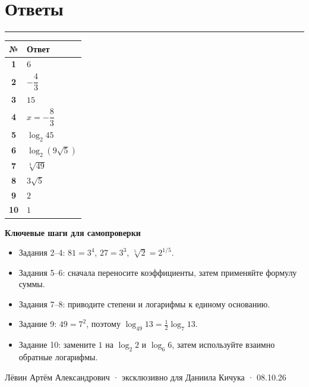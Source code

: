 \documentclass[a4paper,12pt]{article}
\newcommand{\sectionline}{\par\vspace{1pt}\noindent\color{accent}\rule{\linewidth}{0.6pt}\par\color{textgray}\vspace{3pt}}
\begin{document}
\section*{Ответы}
\sectionline
\renewcommand{\arraystretch}{1.42}
\begin{tabularx}{\linewidth}{@{}>{\bfseries}c X@{}}
\toprule
№ & Ответ\\
\midrule
1 & $6$\\
2 & $-\dfrac43$\\
3 & $15$\\
4 & $x=-\dfrac83$\\
5 & $\log_2 45$\\
6 & $\log_2(9\sqrt5)$\\
7 & $\sqrt[3]{49}$\\
8 & $3\sqrt5$\\
9 & $2$\\
10 & $1$\\
\bottomrule
\end{tabularx}
\vspace{11mm}
\textbf{Ключевые шаги для самопроверки}
\begin{itemize}
 \item Задания 2--4: $81=3^4$, $27=3^3$, $\sqrt[5]2=2^{1/5}$.
 \item Задания 5--6: сначала переносите коэффициенты, затем применяйте формулу суммы.
 \item Задания 7--8: приводите степени и логарифмы к единому основанию.
 \item Задание 9: $49=7^2$, поэтому $\log_{49}13=\frac12\log_7 13$.
 \item Задание 10: замените $1$ на $\log_2 2$ и $\log_6 6$, затем используйте взаимно обратные логарифмы.
\end{itemize}
\vfill
\begin{center}
\small\color{softgray}Лёвин Артём Александрович · эксклюзивно для Даниила Кичука · 08.10.26
\end{center}
\end{document}
